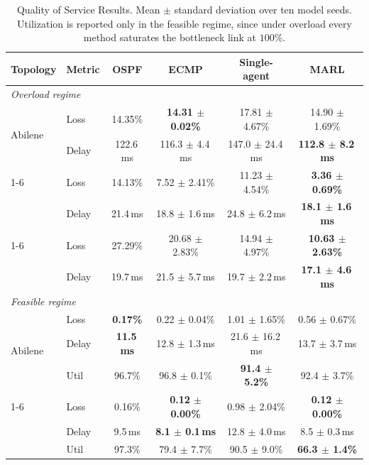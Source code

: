 \begin{table}[htbp]
  \centering
  \small
  \caption{Quality of Service Results. Mean $\pm$ standard deviation over ten model
  seeds. Utilization is reported only in the feasible regime, since under overload
  every method saturates the bottleneck link at $100\%$.}
  \label{tab:qos}
  \setlength{\tabcolsep}{3.5pt}
  \begin{tabular}{llcccc}
    \toprule
    Topology & Metric & OSPF & ECMP & Single-agent & MARL \\
    \midrule
    \multicolumn{6}{l}{\emph{Overload regime}} \\
    \midrule
    \multirow{2}{*}{Abilene}   & Loss  & 14.35\%   & \textbf{14.31 $\pm$ 0.02\%}                     & 17.81 $\pm$ 4.67\% & 14.90 $\pm$ 1.69\%\\
                               & Delay & 122.6\,ms & 116.3 $\pm$ 4.4\,ms                   & 147.0 $\pm$ 24.4\,ms  & \textbf{112.8 $\pm$ 8.2\,ms} \\
    \cmidrule(l){1-6}
    \multirow{2}{*}{GÉANT}     & Loss  & 14.13\%  & 7.52 $\pm$ 2.41\%             & 11.23 $\pm$ 4.54\%          & \textbf{3.36 $\pm$ 0.69\%} \\
                               & Delay & 21.4\,ms & 18.8 $\pm$ 1.6\,ms           & 24.8 $\pm$ 6.2\,ms          & \textbf{18.1 $\pm$ 1.6\,ms} \\
    \cmidrule(l){1-6}
    \multirow{2}{*}{Germany50} & Loss  & 27.29\%  & 20.68 $\pm$ 2.83\%             & 14.94 $\pm$ 4.97\%  & \textbf{10.63 $\pm$ 2.63\%} \\
                               & Delay & 19.7\,ms & 21.5 $\pm$ 5.7\,ms            & 19.7 $\pm$ 2.2\,ms  & \textbf{17.1 $\pm$ 4.6\,ms}   \\
    \midrule
    \multicolumn{6}{l}{\emph{Feasible regime}} \\
    \midrule
    \multirow{3}{*}{Abilene}   & Loss  & \textbf{0.17\%}   & 0.22 $\pm$ 0.04\%             & 1.01 $\pm$ 1.65\%   & 0.56 $\pm$ 0.67\%   \\
                               & Delay & \textbf{11.5\,ms} & 12.8 $\pm$ 1.3\,ms           & 21.6 $\pm$ 16.2\,ms  & 13.7 $\pm$ 3.7\,ms  \\
                               & Util  & 96.7\%            & 96.8 $\pm$ 0.1\%             & \textbf{91.4 $\pm$ 5.2\%} & 92.4 $\pm$ 3.7\% \\

    \cmidrule(l){1-6}
    \multirow{3}{*}{GÉANT}     & Loss  & 0.16\%   & \textbf{0.12 $\pm$ 0.00\%}            & 0.98 $\pm$ 2.04\%   & \textbf{0.12 $\pm$ 0.00\%}  \\
                               & Delay & 9.5\,ms  & \textbf{8.1 $\pm$ 0.1\,ms}           & 12.8 $\pm$ 4.0\,ms  & 8.5 $\pm$ 0.3\,ms \\
                               & Util  & 97.3\%   & 79.4 $\pm$ 7.7\%                      & 90.5 $\pm$ 9.0\%    & \textbf{66.3 $\pm$ 1.4\%} \\


\end{tabular}
\end{table}
